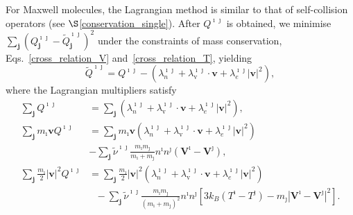 For Maxwell molecules, the Lagrangian method is similar to that of self-collision operators (see $\S$\ref{conservation_single}). After $Q^{\imath\jmath}$ is obtained, we minimise $\sum_\textbf{j}(Q_\textbf{j}^{\imath\jmath}-\tilde{Q}_\textbf{j}^{\imath\jmath})^2$ under the constraints of mass conservation, Eqs.~\eqref{cross_relation_V} and~\eqref{cross_relation_T}, yielding
\begin{equation}\label{Lagrangian_max}
    \widetilde{Q}^{\imath\jmath}={Q}^{\imath\jmath}-(\lambda_n^{\imath\jmath}+\lambda_\text{v}^{\imath\jmath}\cdot{}\textbf{v}+\lambda_e^{\imath\jmath} |\textbf{v}|^2),
\end{equation}
where the Lagrangian multipliers satisfy
\begin{equation}
\begin{split}
  \sum_\textbf{j} Q^{\imath\jmath}&=\sum_\textbf{j} (\lambda_n^{\imath\jmath}+\lambda_\text{v}^{\imath\jmath}\cdot{}\textbf{v}+\lambda_e^{\imath\jmath} |\textbf{v}|^2), \\
    \sum_\textbf{j} m_{\imath}\textbf{v}Q^{\imath\jmath}&=\sum_\textbf{j} m_{\imath}\textbf{v}(\lambda_n^{\imath\jmath}+\lambda_\text{v}^{\imath\jmath}\cdot{}\textbf{v}+\lambda_e^{\imath\jmath} |\textbf{v}|^2)\\
    &
    -\sum_\textbf{j}\tilde{\nu}^{\imath\jmath}\frac{m_\imath{}m_\jmath}{m_\imath+m_\jmath}n^\imath{n^\jmath}(\textbf{V}^\imath-\textbf{V}^\jmath), \\
    \sum_\textbf{j} \frac{m_{\imath}}{2}|\textbf{v}|^2 Q^{\imath\jmath}&=\sum_\textbf{j} \frac{m_{\imath}}{2}|\textbf{v}|^2(\lambda_n^{\imath\jmath}+\lambda_\text{v}^{\imath\jmath}\cdot{}\textbf{v}+\lambda_e^{\imath\jmath}
    |\textbf{v}|^2) \\
    & \ \ \ -\sum_\textbf{j} \tilde{\nu}^{\imath\jmath}\frac{m_\imath{}m_\jmath}{(m_\imath+m_\jmath)^2}n^\imath{n^\jmath}[3k_B(T^\imath-T^\jmath)-m_\jmath|\textbf{V}^\imath-\textbf{V}^\jmath|^2].
\end{split}
\end{equation}



